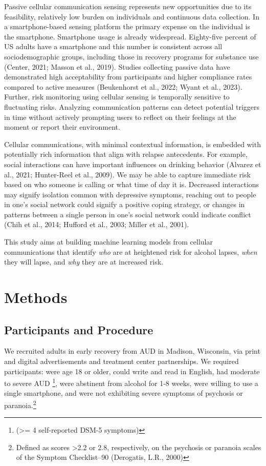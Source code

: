 \documentclass[
  letterpaper,
  DIV=11,
  numbers=noendperiod]{scrartcl}
\begin{document}
Passive cellular communication sensing represents new opportunities due
to its feasibility, relatively low burden on individuals and continuous
data collection. In a smartphone-based sensing platform the primary
expense on the individual is the smartphone. Smartphone usage is already
widespread. Eighty-five percent of US adults have a smartphone and this
number is consistent across all sociodemographic groups, including those
in recovery programs for substance use (Center, 2021; Masson et al.,
2019). Studies collecting passive data have demonstrated high
acceptability from participants and higher compliance rates compared to
active measures (Beukenhorst et al., 2022; Wyant et al., 2023). Further,
risk monitoring using cellular sensing is temporally sensitive to
fluctuating risks. Analyzing communication patterns can detect potential
triggers in time without actively prompting users to reflect on their
feelings at the moment or report their environment.

Cellular communications, with minimal contextual information, is
embedded with potentially rich information that align with relapse
antecedents. For example, social interactions can have important
influences on drinking behavior (Alvarez et al., 2021; Hunter-Reel et
al., 2009). We may be able to capture immediate risk based on who
someone is calling or what time of day it is. Decreased interactions may
signify isolation common with depressive symptoms, reaching out to
people in one's social network could signify a positive coping strategy,
or changes in patterns between a single person in one's social network
could indicate conflict (Chih et al., 2014; Hufford et al., 2003; Miller
et al., 2001).

This study aims at building machine learning models from cellular
communications that identify \emph{who} are at heightened risk for
alcohol lapses, \emph{when} they will lapse, and \emph{why} they are at
increased risk.

\section{Methods}\label{methods}

\subsection{Participants and
Procedure}\label{participants-and-procedure}

We recruited adults in early recovery from AUD in Madison, Wisconsin,
via print and digital advertisements and treatment center partnerships.
We required participants: were age 18 or older, could write and read in
English, had moderate to severe AUD \footnote{(\textgreater= 4
  self-reported DSM-5 symptoms)}, were abstinent from alcohol for 1-8
weeks, were willing to use a single smartphone, and were not exhibiting
severe symptoms of psychosis or paranoia.\footnote{Defined as scores
  \textgreater2.2 or 2.8, respectively, on the psychosis or paranoia
  scales of the Symptom Checklist--90 (Derogatis, L.R., 2000)}
\end{document}

